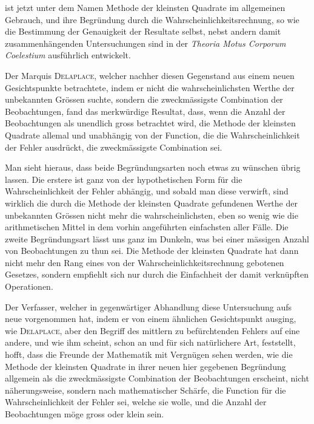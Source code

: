ist jetzt unter dem Namen Methode der kleinsten Quadrate im allgemeinen Gebrauch, und ihre Begründung durch die Wahrscheinlichkeitsrechnung, so wie die Bestimmung der Genauigkeit der Resultate selbst, nebst andern damit zusammenhängenden Untersuchungen sind in der \textit{Theoria Motus Corporum Coelestium} ausführlich entwickelt.

Der Marquis \textsc{Delaplace}, welcher nachher diesen Gegenstand aus einem neuen Gesichtspunkte betrachtete, indem er nicht die wahrscheinlichsten Werthe der unbekannten Grössen suchte, sondern die zweckmässigste Combination der Beobachtungen, fand das merkwürdige Resultat, dass, wenn die Anzahl der Beobachtungen als unendlich gross betrachtet wird, die Methode der kleinsten Quadrate allemal und unabhängig von der Function, die die Wahrscheinlichkeit der Fehler ausdrückt, die zweckmässigste Combination sei.

Man sieht hieraus, dass beide Begründungsarten noch etwas zu wünschen übrig lassen. Die erstere ist ganz von der hypothetischen Form für die Wahrscheinlichkeit der Fehler abhängig, und sobald man diese verwirft, sind wirklich die durch die Methode der kleinsten Quadrate gefundenen Werthe der unbekannten Grössen nicht mehr die wahrscheinlichsten, eben so wenig wie die arithmetischen Mittel in dem vorhin angeführten einfachsten aller Fälle. Die zweite Begründungsart lässt uns ganz im Dunkeln, was bei einer mässigen Anzahl von Beobachtungen zu thun sei. Die Methode der kleinsten Quadrate hat dann nicht mehr den Rang eines von der Wahrscheinlichkeitsrechnung gebotenen Gesetzes, sondern empfiehlt sich nur durch die Einfachheit der damit verknüpften Operationen.

Der Verfasser, welcher in gegenwärtiger Abhandlung diese Untersuchung aufs neue vorgenommen hat, indem er von einem ähnlichen Gesichtspunkt ausging, wie \textsc{Delaplace}, aber den Begriff des mittlern zu befürchtenden Fehlers auf eine andere, und wie ihm scheint, schon an und für sich natürlichere Art, feststellt, hofft, dass die Freunde der Mathematik mit Vergnügen sehen werden, wie die Methode der kleinsten Quadrate in ihrer neuen hier gegebenen Begründung allgemein als die zweckmässigste Combination der Beobachtungen erscheint, nicht näherungsweise, sondern nach mathematischer Schärfe, die Function für die Wahrscheinlichkeit der Fehler sei, welche sie wolle, und die Anzahl der Beobachtungen möge gross oder klein sein.

